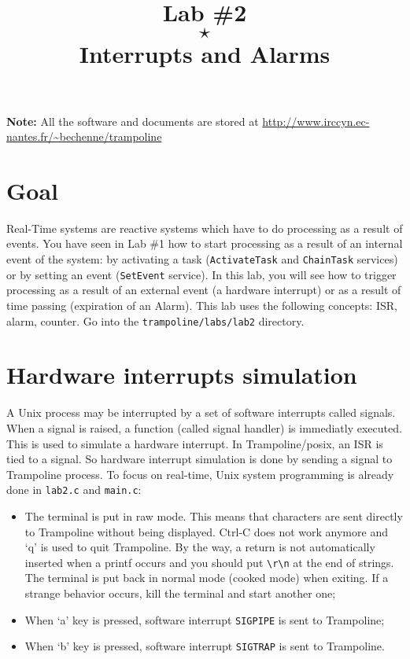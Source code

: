\documentclass[11pt]{article}
\title{Lab \#2\\$\star$\\Interrupts and Alarms}
\author{}
\begin{document}
\maketitle

{\bf Note:} All the software and documents are stored at \url{http://www.irccyn.ec-nantes.fr/~bechenne/trampoline}

\section{Goal}

Real-Time systems are reactive systems which have to do processing as a result of events. You have seen in Lab \#1 how to start processing as a result of an internal event of the system: by activating a task (\texttt{ActivateTask} and \texttt{ChainTask} services) or by setting an event (\texttt{SetEvent} service). In this lab, you will see how to trigger processing as a result of an external event (a hardware interrupt) or as a result of time passing (expiration of an Alarm). This lab uses the following concepts: ISR, alarm, counter.
Go into the \texttt{trampoline/labs/lab2} directory.

\section{Hardware interrupts simulation}

A Unix process may be interrupted by a set of software interrupts called signals. When a signal is raised, a function (called signal handler) is immediatly executed. This is used to simulate a hardware interrupt. In Trampoline/posix, an ISR is tied to a signal.
So hardware interrupt simulation is done by sending a signal to Trampoline process. To focus on real-time, Unix system programming is already done in \texttt{lab2.c} and \texttt{main.c}:

\begin{itemize}
\item The terminal is put in raw mode. This means that characters are sent directly to Trampoline without being displayed. Ctrl-C does not work anymore and `q' is used to quit Trampoline. By the way, a return is not automatically inserted when a printf occurs and you should put \texttt{\textbackslash r\textbackslash n} at the end of strings. The terminal is put back in normal mode (cooked mode) when exiting. If a strange behavior occurs, kill the terminal and start another one;
\item When `a' key is pressed, software interrupt \texttt{SIGPIPE} is sent to Trampoline;
\item When `b' key is pressed, software interrupt \texttt{SIGTRAP} is sent to Trampoline.
\end{itemize}
\end{document}
